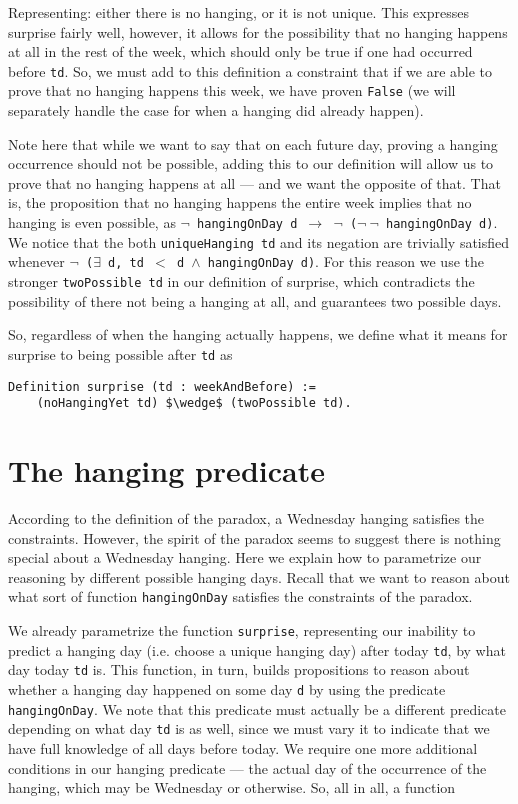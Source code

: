 \documentclass[runningheads]{llncs}
\begin{document}
Representing: either there is no hanging, or it is not unique. This expresses surprise fairly
well, however, it allows for the possibility that no hanging happens at all in the
rest of the week, which should only be true if one had occurred before {\tt td}.
So, we must add to this definition a constraint that if we are able to prove that no
hanging happens this week, we have proven {\tt False} (we will separately handle the case for when
a hanging did already happen).

Note here that while we want to say that on each future day, proving a hanging
occurrence should not be possible, adding this to our definition will allow us to
prove that no hanging happens at all --- and we want the opposite of that.
That is, the proposition that no hanging happens the entire week implies that no
hanging is even possible, as {\tt $\neg$ hangingOnDay d $\to$ $\neg$ ($\neg~\neg$ hangingOnDay d)}.
We notice that the both {\tt uniqueHanging td} and its negation are trivially
satisfied whenever {\tt $\neg$ ($\exists$ d, td $<$ d $\wedge$ hangingOnDay d)}. For this
reason we use the stronger {\tt twoPossible td} in our definition of surprise,
which contradicts the possibility of there not being a hanging at all, and
guarantees two possible days.

So, regardless of when the hanging actually happens, we define what it means
for surprise to being possible after {\tt td} as

\begin{lstlisting}[mathescape=true]
  Definition surprise (td : weekAndBefore) :=
    (noHangingYet td) $\wedge$ (twoPossible td).
\end{lstlisting}

\section{The hanging predicate}
\label{sec:predicate}

According to the definition of the paradox, a Wednesday hanging satisfies
the constraints. However, the spirit of the paradox seems to suggest there is nothing
special about a Wednesday hanging. Here we explain how to parametrize our reasoning
by different possible hanging days. Recall that we want to reason about what sort of
function {\tt hangingOnDay} satisfies the constraints of the paradox.

We already parametrize the function {\tt surprise},
representing our inability to predict a hanging day (i.e. choose a unique hanging day)
after today {\tt td}, by what day today {\tt td} is. This function, in turn, builds propositions
to reason about whether a hanging day happened on some day {\tt d} by using the
predicate {\tt hangingOnDay}. We note that this predicate must actually be a different
predicate depending on what day {\tt td} is as well, since we must vary it to
indicate that we have full knowledge of all days before today.
We require one more additional conditions in our hanging predicate --- the
actual day of the occurrence of the hanging, which may be Wednesday or otherwise.
So, all in all, a function
\end{document}
